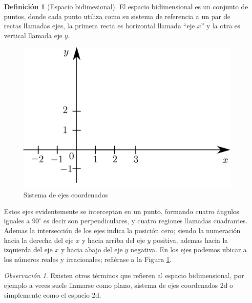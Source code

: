\documentclass[
  16pt,
]{krantz}
\theoremstyle{definition}
\newtheorem{definition}{Definición}[chapter]
\theoremstyle{definition}
\theoremstyle{definition}
\theoremstyle{definition}
\theoremstyle{remark}
\newtheorem*{remark}{Observación}
\begin{document}
\begin{definition}[Espacio bidimesional]
\protect\hypertarget{def:r2}{}{\label{def:r2} {} }El espacio bidimensional es un conjunto de puntos, donde cada punto utiliza como su sistema de referencia a un par de rectas llamadas ejes, la primera recta es horizontal llamada ``eje \(x\)'' y la otra es vertical llamada eje \(y\).
\end{definition}

\begin{figure}[!ht]

{\centering \includegraphics{ejes} 

}

\caption{Sistema de ejes coordenados}\label{fig:2d}
\end{figure}

Estos ejes evidentemente se interceptan en un punto, formando cuatro ángulos iguales a \(90^\circ\) es decir son perpendiculares, y cuatro regiones llamadas cuadrantes. Ademas la intersección de los ejes indica la posición cero; siendo la numeración hacia la derecha del eje \(x\) y hacia arriba del eje \(y\) positiva, ademas hacia la izquierda del eje \(x\) y hacia abajo del eje \(y\) negativa. En los ejes podemos ubicar a los números reales y irracionales; refiérase a la Figura \ref{fig:2d}.

\begin{remark}
{}Existen otros términos que refieren al espacio bidimensional, por ejemplo a veces suele llamarse como plano, sistema de ejes coordenados 2d o simplemente como el espacio 2d.
\end{remark}
\end{document}
